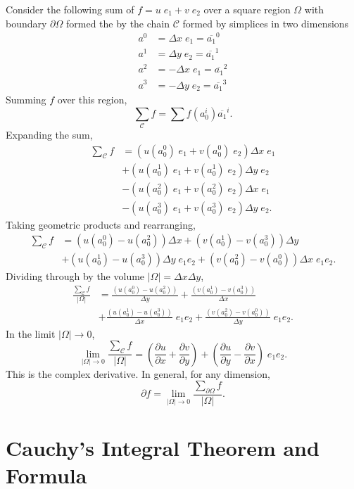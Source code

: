 	Consider the following sum of $f=u\;e_1 + v\;e_2$ over a square region $\Omega$ with boundary $\partial\Omega$ formed the by the chain $\mathcal{C}$ formed by simplices in two dimensions
	\begin{align*}
	a^0 &= \Delta x\;e_1 = \overline{a_1}^0 \\
	a^1 &= \Delta y\;e_2 =\overline{a_1}^1 \\
	a^2 &= -\Delta x\;e_1 =\overline{a_1}^2 \\
	a^3 &= -\Delta y\;e_2 =\overline{a_1}^3
	\end{align*}
	Summing $f$ over this region,
	\[
	\sum_\mathcal{C} f = \sum f\left(a^i_0\right) \overline{a_1}^i.	
	\]
	Expanding the sum,
	\begin{align*}
	\sum_\mathcal{C} f &= \left(u\left(a^0_0\right)\;e_1 + v\left(a^0_0\right)\;e_2\right)\Delta x\;e_1 \\
	&+ \left(u\left(a^1_0\right)\;e_1 + v\left(a^1_0\right)\;e_2\right)\Delta y\;e_2 \\
	&- \left(u\left(a^2_0\right)\;e_1 + v\left(a^2_0\right)\;e_2\right)\Delta x\;e_1 \\
	&- \left(u\left(a^3_0\right)\;e_1 + v\left(a^3_0\right)\;e_2\right)\Delta y\;e_2.
	\end{align*}
	Taking geometric products and rearranging,
	\begin{align*}
	\sum_\mathcal{C} f &= \left(u\left(a^0_0\right) - u\left(a^2_0\right)\right) \Delta x + \left(v\left(a^1_0\right) - v\left(a^3_0\right)\right) \Delta y\\
	&+ \left(u\left(a^1_0\right) - u\left(a^3_0\right)\right) \Delta y\;e_1e_2 + \left(v\left(a^2_0\right) - v\left(a^0_0\right)\right) \Delta x\;e_1e_2.
	\end{align*}
	Dividing through by the volume $|\Omega|=\Delta x\Delta y$,
	\begin{align*}
	\frac{\sum_\mathcal{C} f}{|\Omega|} &= \frac{\left(u\left(a^0_0\right) - u\left(a^2_0\right)\right)}{\Delta y} + \frac{\left(v\left(a^1_0\right) - v\left(a^3_0\right)\right)}{\Delta x}\\
	&+ \frac{\left(u\left(a^1_0\right) - u\left(a^3_0\right)\right)}{\Delta x}\;e_1e_2 + \frac{\left(v\left(a^2_0\right) - v\left(a^0_0\right)\right)}{ \Delta y}\;e_1e_2.
	\end{align*}
	In the limit $|\Omega|\rightarrow 0$,
	\[
	\lim_{|\Omega|\rightarrow 0}\frac{\sum_\mathcal{C} f}{|\Omega|} = \left(\frac{\partial u}{\partial x} + \frac{\partial v}{\partial y}\right) + \left(\frac{\partial u}{\partial y} - \frac{\partial v}{\partial x}\right)\;e_1e_2.
	\]
	This is the complex derivative. In general, for any dimension,
	\[
	\partial f = \lim_{|\Omega|\rightarrow 0} \frac{\sum_{\partial\Omega} f}{|\Omega|}.
	\]
	
	\section{Cauchy's Integral Theorem and Formula}
	
	